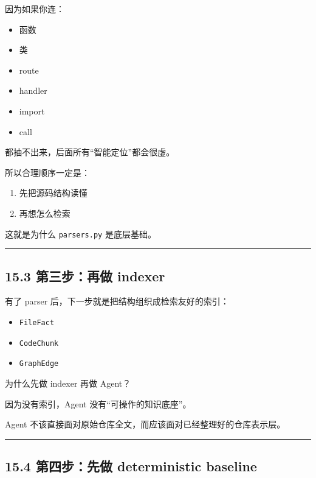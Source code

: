 \documentclass[UTF8,12pt,openany]{ctexbook}
\begin{document}
因为如果你连：\par

\begin{itemize}
\item 函数
\item 类
\item route
\item handler
\item import
\item call
\end{itemize}

都抽不出来，后面所有“智能定位”都会很虚。\par

所以合理顺序一定是：\par

\begin{enumerate}
\item 先把源码结构读懂
\item 再想怎么检索
\end{enumerate}

这就是为什么 \texttt{parsers.py} 是底层基础。\par

\hrule

\subsection{15.3 第三步：再做 indexer}

有了 parser 后，下一步就是把结构组织成检索友好的索引：\par

\begin{itemize}
\item \texttt{FileFact}
\item \texttt{CodeChunk}
\item \texttt{GraphEdge}
\end{itemize}

为什么先做 indexer 再做 Agent？\par

因为没有索引，Agent 没有“可操作的知识底座”。\par

Agent 不该直接面对原始仓库全文，而应该面对已经整理好的仓库表示层。\par

\hrule

\subsection{15.4 第四步：先做 deterministic baseline}
\end{document}

